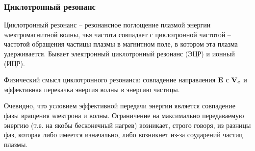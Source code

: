 \documentclass[10pt, a4paper]{article}
\begin{document}
%
%
%
%
%
%
%
%
%

\subsubsection{Циклотронный резонанс}

Циклотронный резонанс -- резонансное поглощение плазмой энергии электромагнитной волны, чья частота совпадает с циклотронной частотой -- частотой обращения частицы плазмы в магнитном поле, в котором эта плазма удерживается. Бывает электронный циклотронный резонанс (ЭЦР) и ионный (ИЦР).

Физический смысл циклотронного резонанса: совпадение направления $\vb{E}$ с $\vb{V_e}$ и эффективная перекачка энергия волны в энергию частицы.

Очевидно, что условием эффективной передачи энергии является совпадение фазы вращения электрона и волны. Ограничение на максимально передаваемую энергию (т.е. на якобы бесконечный нагрев) возникает, строго говоря, из разницы фаз, которая либо имеется изначально, либо возникнет из-за соударений частиц плазмы.
\end{document}
